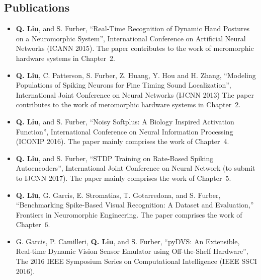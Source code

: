\subsection{Publications}
\begin{itemize}
	\item 
	\textbf{Q. Liu}, and S. Furber, “Real-Time Recognition of Dynamic Hand Postures on a Neuromorphic System”, International Conference on Artificial Neural Networks (ICANN 2015).
	The paper contributes to the work of meromorphic hardware systems in Chapter~2.
	
	\item
	\textbf{Q. Liu}, C. Patterson, S. Furber, Z. Huang, Y. Hou and H. Zhang, “Modeling Populations of Spiking Neurons for Fine Timing Sound Localization”, International Joint Conference on Neural Networks (IJCNN 2013)
	The paper contributes to the work of meromorphic hardware systems in Chapter~2.
	
	\item 
	\textbf{Q. Liu}, and S. Furber, “Noisy Softplus: A Biology Inspired Activation Function”, International Conference on Neural Information Processing (ICONIP 2016). 
	The paper mainly comprises the work of Chapter~4.
	
	
	\item 
	\textbf{Q. Liu}, and S. Furber, “STDP Training on Rate-Based Spiking Autoencoders”, International Joint Conference on Neural Network (to submit to IJCNN 2017).
	The paper mainly comprises the work of Chapter~5.
	
	\item 
	\textbf{Q. Liu}, G. Garcis, E. Stromatias, T. Gotarredona, and S. Furber, “Benchmarking Spike-Based Visual Recognition: A Dataset and Evaluation,” Frontiers in Neuromorphic Engineering.
	The paper comprises the work of Chapter~6.
	

	\item 
	G. Garcis, P. Camilleri, \textbf{Q. Liu}, and S. Furber, “pyDVS: An Extensible, Real-time Dynamic Vision Sensor Emulator using Off-the-Shelf Hardware”, The 2016 IEEE Symposium Series on Computational Intelligence (IEEE SSCI 2016).
	
	
\end{itemize}	

